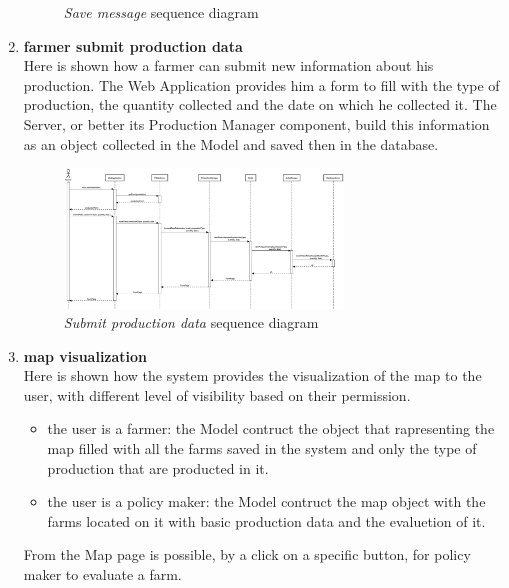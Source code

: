 \begin{enumerate}
\begin{figure}[H]
\begin{center}
        \caption{\emph{Save message} sequence diagram}
        \label{fig:sequence3}
        \end{center}
    \end{figure}
    \item \textbf{farmer submit production data}\\
    Here is shown how a farmer can submit new information about his production. The Web Application provides him a form to fill with the type of production, the quantity collected and the date on which he collected it. The Server, or better its Production Manager component, build this information as an object collected in the Model and saved then in the database.
    \begin{figure}[H]
        \begin{center}
        \includegraphics[width=0.7\textwidth]{sequence/addData-2.png}
        \caption{\emph{Submit production data} sequence diagram}
        \label{fig:sequence4}
        \end{center}
    \end{figure}
    \item \textbf{map visualization}\\
    Here is shown how the system provides the visualization of the map to the user, with different level of visibility based on their permission.
        \begin{itemize}
            \item the user is a farmer: the Model contruct the object that rapresenting the map filled with all the farms saved in the system and only the type of production that are producted in it.
            \item the user is a policy maker: the Model contruct the map object with the farms located on it with basic production data and the evaluetion of it.
        \end{itemize}
    From the Map page is possible, by a click on a specific button, for policy maker to evaluate a farm.
    \begin{figure}[H]
        \begin{center}

\end{center}
\end{figure}
\end{enumerate}
